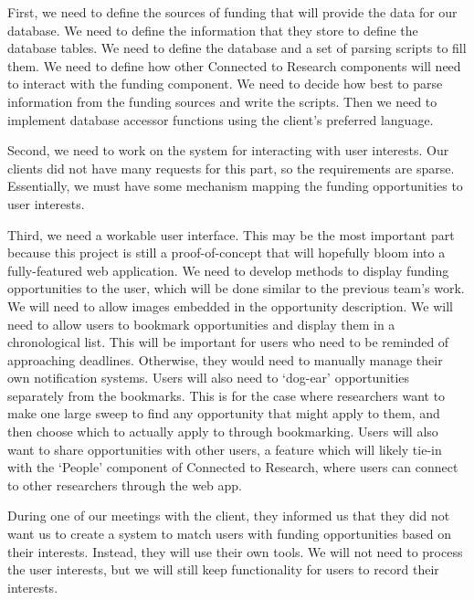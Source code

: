 \documentclass[onecolumn]{IEEEtran}
\begin{document}
First, we need to define the sources of funding that will provide the data for our database. We need to define the information that they store to define the database tables. We need to define the database and a set of parsing scripts to fill them. We need to define how other Connected to Research components will need to interact with the funding component. We need to decide how best to parse information from the funding sources and write the scripts. Then we need to implement database accessor functions using the client's preferred language. 

Second, we need to work on the system for interacting with user interests. Our clients did not have many requests for this part, so the requirements are sparse. Essentially, we must have some mechanism mapping the funding opportunities to user interests. 

Third, we need a workable user interface. This may be the most important part because this project is still a proof-of-concept that will hopefully bloom into a fully-featured web application. We need to develop methods to display funding opportunities to the user, which will be done similar to the previous team's work. We will need to allow images embedded in the opportunity description. We will need to allow users to bookmark opportunities and display them in a chronological list. This will be important for users who need to be reminded of approaching deadlines. Otherwise, they would need to manually manage their own notification systems. Users will also need to `dog-ear' opportunities separately from the bookmarks. This is for the case where researchers want to make one large sweep to find any opportunity that might apply to them, and then choose which to actually apply to through bookmarking. Users will also want to share opportunities with other users, a feature which will likely tie-in with the `People' component of Connected to Research, where users can connect to other researchers through the web app. 

During one of our meetings with the client, they informed us that they did not want us to create a system to match users with funding opportunities based on their interests. Instead, they will use their own tools. We will not need to process the user interests, but we will still keep functionality for users to record their interests.
\clearpage
\addtocounter{page}{5}
\end{document}
